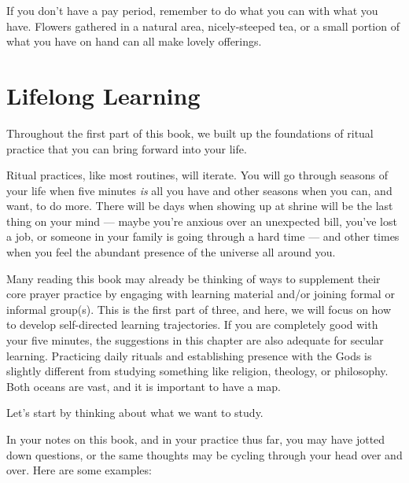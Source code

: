 \documentclass[
]{book}
\begin{document}
If you don't have a pay period, remember to do what you can with what you have. Flowers gathered in a natural area, nicely-steeped tea, or a small portion of what you have on hand can all make lovely offerings.

\hypertarget{lifelong-learning}{%
\chapter{Lifelong Learning}\label{lifelong-learning}}

Throughout the first part of this book, we built up the foundations of ritual practice that you can bring forward into your life.

Ritual practices, like most routines, will iterate. You will go through seasons of your life when five minutes \emph{is} all you have and other seasons when you can, and want, to do more. There will be days when showing up at shrine will be the last thing on your mind --- maybe you're anxious over an unexpected bill, you've lost a job, or someone in your family is going through a hard time --- and other times when you feel the abundant presence of the universe all around you.

Many reading this book may already be thinking of ways to supplement their core prayer practice by engaging with learning material and/or joining formal or informal group(s). This is the first part of three, and here, we will focus on how to develop self-directed learning trajectories. If you are completely good with your five minutes, the suggestions in this chapter are also adequate for secular learning. Practicing daily rituals and establishing presence with the Gods is slightly different from studying something like religion, theology, or philosophy. Both oceans are vast, and it is important to have a map.

Let's start by thinking about what we want to study.

In your notes on this book, and in your practice thus far, you may have jotted down questions, or the same thoughts may be cycling through your head over and over. Here are some examples:
\end{document}

